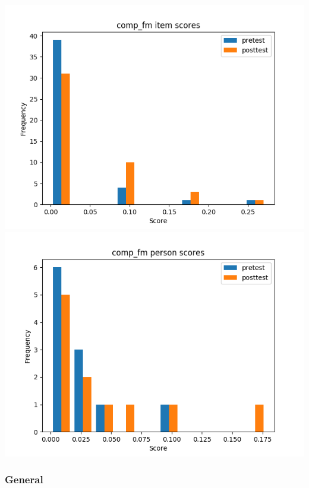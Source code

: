 \documentclass[]{article}
\begin{document}
\includegraphics{comp_fm_diff.png} \includegraphics{comp_fm_abil.png}

\subsubsection{General}\label{general-1}
\end{document}
